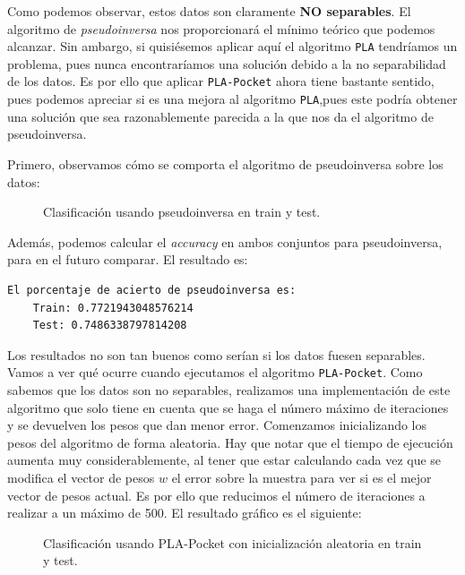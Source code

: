 \documentclass[12pt]{article}
\begin{document}
{Como podemos observar, estos datos son claramente \textbf{NO separables}. El algoritmo de \emph{pseudoinversa} nos proporcionará el mínimo teórico que podemos alcanzar. Sin ambargo, si quisiésemos aplicar aquí el algoritmo \lstinline{PLA} tendríamos un problema, pues nunca encontraríamos una solución debido a la no separabilidad de los datos. Es por ello que aplicar \lstinline{PLA-Pocket} ahora tiene bastante sentido, pues podemos apreciar si es una mejora al algoritmo \lstinline{PLA},pues este podría obtener una solución que sea razonablemente parecida a la que nos da el algoritmo de pseudoinversa. 

Primero, observamos cómo se comporta el algoritmo de pseudoinversa sobre los datos:
\begin{figure}[H]
  \centering
  \qquad
  \caption{Clasificación usando pseudoinversa en train y test.}
\label{fig:myfig:4}
\end{figure}
Además, podemos calcular el \emph{accuracy} en ambos conjuntos para pseudoinversa, para en el futuro comparar. El resultado es:
\begin{lstlisting}[language=bash]
  El porcentaje de acierto de pseudoinversa es:
    Train: 0.7721943048576214
    Test: 0.7486338797814208
\end{lstlisting}
Los resultados no son tan buenos como serían si los datos fuesen separables. Vamos a ver qué ocurre cuando ejecutamos el algoritmo \lstinline{PLA-Pocket}. Como sabemos que los datos son no separables, realizamos una implementación de este algoritmo que solo tiene en cuenta que se haga el número máximo de iteraciones y se devuelven los pesos que dan menor error. Comenzamos inicializando los pesos del algoritmo de forma aleatoria. Hay que notar que el tiempo de ejecución aumenta muy considerablemente, al tener que estar calculando cada vez que se modifica el vector de pesos $w$ el error sobre la muestra para ver si es el mejor vector de pesos actual. Es por ello que reducimos el número de iteraciones a realizar a un máximo de 500. El resultado gráfico es el siguiente:
\begin{figure}[H]
  \centering
  \qquad
  \caption{Clasificación usando PLA-Pocket con inicialización aleatoria en train y test.}
\label{fig:myfig:4}
\end{figure}

}
\end{document}
